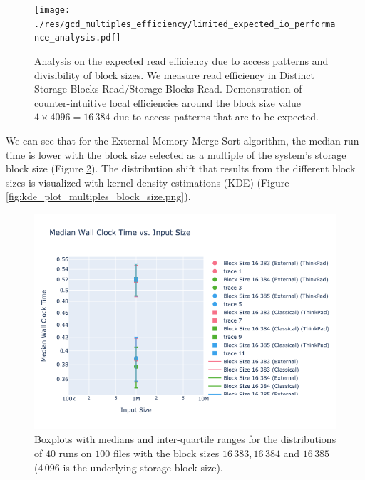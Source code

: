 \documentclass[twocolumn]{article}
\begin{document}
\begin{figure}[htb]
    \begin{minipage}{0.475 \textwidth}
        \centering
        \texttt{[image: ./res/gcd\_multiples\_efficiency/limited\_expected\_io\_performance\_analysis.pdf]}
        \caption{Analysis on the expected read efficiency due to access patterns and divisibility of block sizes. We measure read efficiency in Distinct Storage Blocks Read\( / \)Storage Blocks Read. Demonstration of
            counter-intuitive local efficiencies around the block size value \( 4 \times 4096 = 16\,384 \) due to access patterns that are to be expected. }
        \label{fig:limited_expected_io_performance_analysis.pdf}
    \end{minipage}
\end{figure}

We can see that for the External Memory Merge Sort algorithm, the median run time is lower with the block size selected as a multiple of the system's storage block size
(Figure \ref{fig:visualization_multiples_block_size.png}).
The distribution shift that results from the different block sizes is visualized with kernel density estimations (KDE) (Figure \ref{fig:kde_plot_multiples_block_size.png}).
\begin{figure}
    \centering
    \includegraphics[width=0.8 \textwidth]{./res/visualization_multiples_block_size.png}
    \caption{Boxplots with medians and inter-quartile ranges for the distributions of \( 40 \) runs on \( 100 \) files with the block sizes \( 16\,383, 16\,384 \) and \( 16\,385\) (\(4\,096\) is
        the underlying storage block size).}
    \label{fig:visualization_multiples_block_size.png}
\end{figure}
\end{document}
